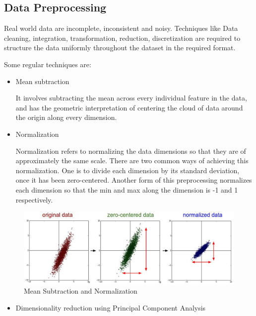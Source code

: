 \documentclass{article}
\begin{document}
\begin{multicols*}{2}
\subsection{Data Preprocessing}

Real world data are incomplete, inconsistent and noisy. Techniques like Data cleaning, integration, transformation, reduction, discretization are required to structure the data uniformly throughout the dataset in the required format.

Some regular techniques are:
\begin{itemize}


\item Mean subtraction 

It involves subtracting the mean across every individual feature in the data, and has the geometric interpretation of centering the cloud of data around the origin along every dimension.

\item Normalization

Normalization refers to normalizing the data dimensions so that they are of approximately the same scale. There are two common ways of achieving this normalization. One is to divide each dimension by its standard deviation, once it has been zero-centered. Another form of this preprocessing normalizes each dimension so that the min and max along the dimension is -1 and 1 respectively. 
\end{itemize}
\begin{figure}[H]
\centering
\includegraphics[scale=0.26]{prepro1.jpeg}
\caption{Mean Subtraction and Normalization}
\end{figure}
\begin{itemize}
\item Dimensionality reduction using Principal Component Analysis


\end{itemize}
\end{multicols*}
\end{document}
